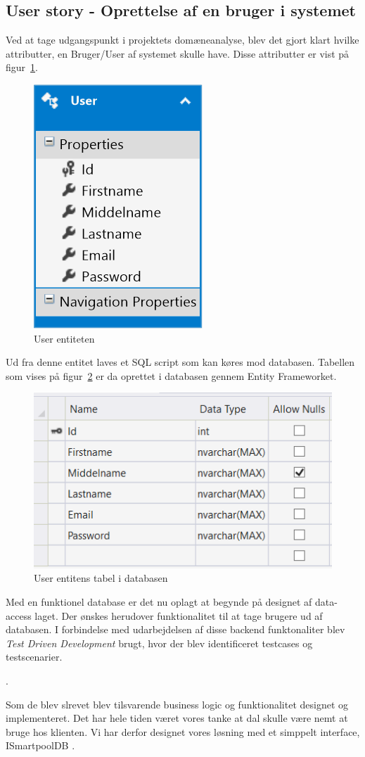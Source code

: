 \subsection{User story - Oprettelse af en bruger i systemet}

Ved at tage udgangspunkt i projektets domæneanalyse, blev det gjort klart hvilke attributter, en Bruger/User af systemet skulle have. Disse attributter er vist på figur~\ref{fig:database_model_1}.

\begin{figure}[h]
\centering
\includegraphics[width=0.2\linewidth]{figs/database/database_model_1.png}
\caption{User entiteten}
\label{fig:database_model_1}
\end{figure}


Ud fra denne entitet laves et SQL script som kan køres mod databasen. Tabellen som vises på figur~\ref{fig:usertable} er da oprettet i databasen gennem Entity Frameworket.

\begin{figure}[h]
\centering
\includegraphics[width=0.5\linewidth]{figs/database/usertable}
\caption{User entitens tabel i databasen}
\label{fig:usertable}
\end{figure}


Med en funktionel database er det nu oplagt at begynde på designet af data-access laget. Der ønskes herudover funktionalitet til at tage brugere ud af databasen. I forbindelse med udarbejdelsen af disse backend funktonaliter blev \textit{Test Driven Development} brugt, hvor der blev identificeret testcases og testscenarier.


.

Som de blev slrevet blev tilsvarende business logic og funktionalitet designet og implementeret.
Det har hele tiden været vores tanke at dal skulle være nemt at bruge hos klienten. Vi har derfor designet vores løsning med et simppelt interface, ISmartpoolDB .

